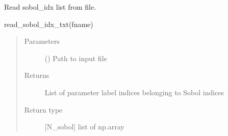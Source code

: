 \documentclass[letterpaper,10pt,english,openany,oneside]{sphinxmanual}
\begin{document}

\begin{fulllineitems}
\label{\detokenize{pygpc:pygpc.io.read_sobol_idx_txt}}
Read sobol\_idx list from file.

read\_sobol\_idx\_txt(fname)
\begin{quote}\begin{description}
\item[{Parameters}] \leavevmode
{} () \textendash{} Path to input file

\item[{Returns}] \leavevmode
{} \textendash{} List of parameter label indices belonging to Sobol indices

\item[{Return type}] \leavevmode
{[}N\_sobol{]} list of np.array

\end{description}\end{quote}

\end{fulllineitems}

\end{document}

